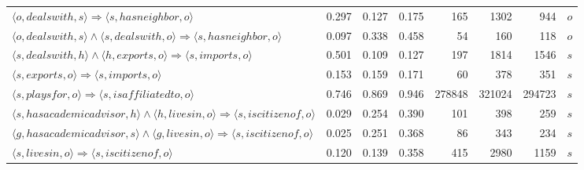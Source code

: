 \begin{tabular}{lrrrrrrl}
                                                $\langle o, dealswith, s \rangle \Rightarrow \langle s, hasneighbor , o \rangle$ &          0.297 &              0.127 &              0.175 &                             165 &                        1302 &                             944 &        $o$ \\
         $\langle o, dealswith, s \rangle \wedge \langle s, dealswith, o \rangle \Rightarrow \langle s, hasneighbor , o \rangle$ &          0.097 &              0.338 &              0.458 &                              54 &                         160 &                             118 &        $o$ \\
               $\langle s, dealswith, h \rangle \wedge \langle h, exports, o \rangle \Rightarrow \langle s, imports , o \rangle$ &          0.501 &              0.109 &              0.127 &                             197 &                        1814 &                            1546 &        $s$ \\
                                                      $\langle s, exports, o \rangle \Rightarrow \langle s, imports , o \rangle$ &          0.153 &              0.159 &              0.171 &                              60 &                         378 &                             351 &        $s$ \\
                                              $\langle s, playsfor, o \rangle \Rightarrow \langle s, isaffiliatedto , o \rangle$ &          0.746 &              0.869 &              0.946 &                          278848 &                      321024 &                          294723 &        $s$ \\
  $\langle s, hasacademicadvisor, h \rangle \wedge \langle h, livesin, o \rangle \Rightarrow \langle s, iscitizenof , o \rangle$ &          0.029 &              0.254 &              0.390 &                             101 &                         398 &                             259 &        $s$ \\
  $\langle g, hasacademicadvisor, s \rangle \wedge \langle g, livesin, o \rangle \Rightarrow \langle s, iscitizenof , o \rangle$ &          0.025 &              0.251 &              0.368 &                              86 &                         343 &                             234 &        $s$ \\
                                                  $\langle s, livesin, o \rangle \Rightarrow \langle s, iscitizenof , o \rangle$ &          0.120 &              0.139 &              0.358 &                             415 &                        2980 &                            1159 &        $s$ \\

\end{tabular}
